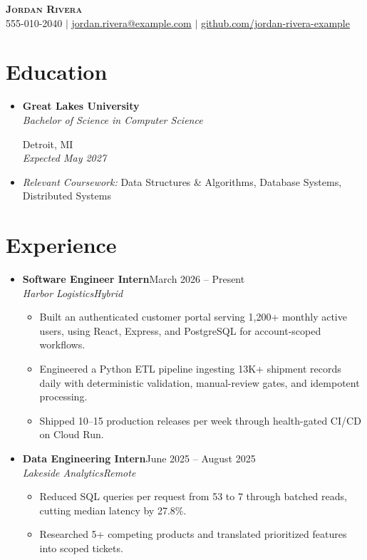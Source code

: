 \documentclass[letterpaper,10pt]{article}
\newcommand{\resumeItem}[1]{
  \item\small{
    {#1 \vspace{-1pt}}
  }
}
\newcommand{\resumeEducationHeading}[4]{
  \vspace{-2pt}\item
    \begin{minipage}[t]{0.70\linewidth}
      \textbf{#1} \\[-1pt]
      \textit{\small #2}
    \end{minipage}\hfill
    \begin{minipage}[t]{0.28\linewidth}
      \raggedleft #3 \\[-1pt]
      \textit{\small #4}
    \end{minipage}\par\vspace{-5pt}
}
\newcommand{\resumeExperienceHeading}[4]{
  \vspace{-2pt}\item
    \textbf{#2}\hfill #4 \\[-1pt]
    \textit{\small #1}\hfill\textit{\small #3}\par\vspace{-5pt}
}
\newcommand{\resumeSubHeadingListStart}{
  \begin{itemize}[leftmargin=0.15in, label={}]
}
\newcommand{\resumeSubHeadingListEnd}{
  \end{itemize}
}
\newcommand{\resumeItemListStart}{
  \begin{itemize}
}
\newcommand{\resumeItemListEnd}{
  \end{itemize}\vspace{-2pt}
}
\begin{document}
\begin{center}
    \textbf{\Huge \scshape Jordan Rivera} \\ \vspace{1pt}
    \small
    555-010-2040 $|$
    \href{mailto:jordan.rivera@example.com}{jordan.rivera@example.com} $|$
    \href{https://github.com/jordan-rivera-example}{github.com/jordan-rivera-example}
\end{center}

\section{Education}
  \resumeSubHeadingListStart
    \resumeEducationHeading
      {Great Lakes University}
      {Bachelor of Science in Computer Science}
      {Detroit, MI}
      {Expected May 2027}
    \item
      {\footnotesize
      \textit{Relevant Coursework:}
      Data Structures \& Algorithms, Database Systems, Distributed Systems}
  \resumeSubHeadingListEnd

\section{Experience}
  \resumeSubHeadingListStart

  \resumeExperienceHeading
      {Harbor Logistics}
      {Software Engineer Intern}
      {Hybrid}
      {March 2026 -- Present}
      \resumeItemListStart
        \resumeItem{
          Built an authenticated customer portal serving 1,200+ monthly active users, using React, Express, and PostgreSQL for account-scoped workflows.
        }
        \resumeItem{
          Engineered a Python ETL pipeline ingesting 13K+ shipment records daily with deterministic validation, manual-review gates, and idempotent processing.
        }
        \resumeItem{
          Shipped 10--15 production releases per week through health-gated CI/CD on Cloud Run.
        }
      \resumeItemListEnd

  \resumeExperienceHeading
      {Lakeside Analytics}
      {Data Engineering Intern}
      {Remote}
      {June 2025 -- August 2025}
      \resumeItemListStart
        \resumeItem{
          Reduced SQL queries per request from 53 to 7 through batched reads, cutting median latency by 27.8\%.
        }
        \resumeItem{
          Researched 5+ competing products and translated prioritized features into scoped tickets.
        }
      \resumeItemListEnd

  \resumeSubHeadingListEnd
\end{document}
